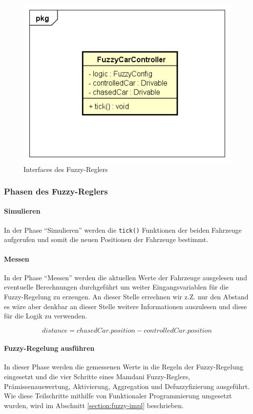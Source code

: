 \documentclass[12pt,a4paper,bibliography=totocnumbered,listof=totocnumbered, abstracton]{scrartcl}
\def\code#1{\texttt{#1}}
\theoremstyle{Umgebung}
\begin{document}
\begin{figure}
	\centering
	\includegraphics[width=0.4\linewidth]{img/practical/controller-diagram}
	\caption{Interfaces des Fuzzy-Reglers}
	\label{fig:controller-diagram}
\end{figure}

\subsubsection{Phasen des Fuzzy-Reglers}

\paragraph{Simulieren}

In der Phase \enquote{Simulieren} werden die \code{tick()} Funktionen der beiden Fahrzeuge aufgerufen und somit die neuen Positionen der Fahrzeuge bestimmt.

\paragraph{Messen}

In der Phase \enquote{Messen} werden die aktuellen Werte der Fahrzeuge ausgelesen und eventuelle Berechnungen durchgeführt um weiter Eingangsvariablen für die Fuzzy-Regelung zu erzeugen. An dieser Stelle errechnen wir z.Z. nur den Abstand es wäre aber denkbar an dieser Stelle weitere Informationen auszulesen und diese für die Logik zu verwenden.

\begin{equation}
	distance = chasedCar.position - controlledCar.position
\end{equation}

\paragraph{Fuzzy-Regelung ausführen}

In dieser Phase werden die gemessenen Werte in die Regeln der Fuzzy-Regelung eingesetzt und die vier Schritte eines Mamdani Fuzzy-Reglers, Prämissenauswertung, Aktivierung, Aggregation und Defuzzyfizierung ausgeführt. Wie diese Teilschritte mithilfe von Funktionaler Programmierung umgesetzt wurden, wird im Abschnitt \ref{section:fuzzy-impl} beschrieben.
\end{document}
